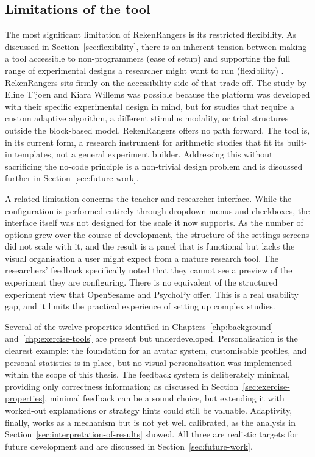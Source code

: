 \subsection{Limitations of the tool}
The most significant limitation of RekenRangers is its restricted flexibility. As discussed in Section~\ref{sec:flexibility}, there is an inherent tension between making a tool accessible to non-programmers (ease of setup) and supporting the full range of experimental designs a researcher might want to run (flexibility) \cite{lidwell2010universal}. RekenRangers sits firmly on the accessibility side of that trade-off. The study by Eline T'joen and Kiara Willems was possible because the platform was developed with their specific experimental design in mind, but for studies that require a custom adaptive algorithm, a different stimulus modality, or trial structures outside the block-based model, RekenRangers offers no path forward. The tool is, in its current form, a research instrument for arithmetic studies that fit its built-in templates, not a general experiment builder. Addressing this without sacrificing the no-code principle is a non-trivial design problem and is discussed further in Section~\ref{sec:future-work}.

A related limitation concerns the teacher and researcher interface. While the configuration is performed entirely through dropdown menus and checkboxes, the interface itself was not designed for the scale it now supports. As the number of options grew over the course of development, the structure of the settings screens did not scale with it, and the result is a panel that is functional but lacks the visual organisation a user might expect from a mature research tool. The researchers' feedback specifically noted that they cannot see a preview of the experiment they are configuring. There is no equivalent of the structured experiment view that OpenSesame and PsychoPy offer. This is a real usability gap, and it limits the practical experience of setting up complex studies.

Several of the twelve properties identified in Chapters~\ref{chp:background} and~\ref{chp:exercise-tools} are present but underdeveloped. Personalisation is the clearest example: the foundation for an avatar system, customisable profiles, and personal statistics is in place, but no visual personalisation was implemented within the scope of this thesis. The feedback system is deliberately minimal, providing only correctness information; as discussed in Section~\ref{sec:exercise-properties}, minimal feedback can be a sound choice, but extending it with worked-out explanations or strategy hints could still be valuable. Adaptivity, finally, works as a mechanism but is not yet well calibrated, as the analysis in Section~\ref{sec:interpretation-of-results} showed. All three are realistic targets for future development and are discussed in Section~\ref{sec:future-work}.

